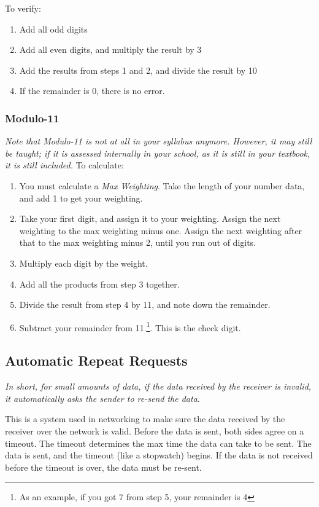 \documentclass[../main.tex]{subfiles}
\begin{document}
To verify:

\begin{enumerate}
    \item Add all odd digits
    \item Add all even digits, and multiply the result by 3
    \item Add the results from steps 1 and 2, and divide the result by 10
    \item If the remainder is 0, there is no error.
\end{enumerate}

\subsubsection{Modulo-11}

\emph{Note that Modulo-11 is not at all in your syllabus anymore. However, it may still be taught; if it is assessed internally in your school, as it is still in your textbook, it is still included.} To calculate:

\begin{enumerate}
    \item You must calculate a \emph{Max Weighting}. Take the length of your number data, and add 1 to get your weighting.
    \item Take your first digit, and assign it to your weighting. Assign the next weighting to the max weighting minus one. Assign the next weighting after that to the max weighting minus 2, until you run out of digits.
    \item Multiply each digit by the weight.
    \item Add all the products from step 3 together.
    \item Divide the result from step 4 by 11, and note down the remainder.
    \item Subtract your remainder from 11.\footnote{As an example, if you got 7 from step 5, your remainder is 4}. This is the check digit.
\end{enumerate}

\subsection{Automatic Repeat Requests}

\emph{In short, for small amounts of data, if the data received by the receiver is invalid, it automatically asks the sender to re-send the data}.

This is a system used in networking to make sure the data received by the receiver over the network is valid. Before the data is sent, both sides agree on a timeout. The timeout determines the max time the data can take to be sent. The data is sent, and the timeout (like a stopwatch) begins. If the data is not received before the timeout is over, the data must be re-sent.
\end{document}

